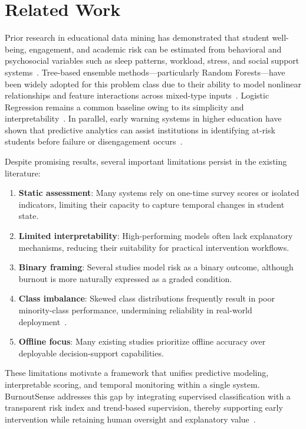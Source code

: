 \documentclass[conference]{IEEEtran}
\begin{document}
\section{Related Work}

Prior research in educational data mining has demonstrated that student well-being, engagement, and academic risk can be estimated from behavioral and psychosocial variables such as sleep patterns, workload, stress, and social support systems~\cite{edm_survey, student_stress_ml}. Tree-based ensemble methods---particularly Random Forests---have been widely adopted for this problem class due to their ability to model nonlinear relationships and feature interactions across mixed-type inputs~\cite{rf_foundation}. Logistic Regression remains a common baseline owing to its simplicity and interpretability~\cite{logreg_multiclass}. In parallel, early warning systems in higher education have shown that predictive analytics can assist institutions in identifying at-risk students before failure or disengagement occurs~\cite{early_warning_higher_ed}.

Despite promising results, several important limitations persist in the existing literature:

\begin{enumerate}[leftmargin=*]
    \item \textbf{Static assessment}: Many systems rely on one-time survey scores or isolated indicators, limiting their capacity to capture temporal changes in student state.
    \item \textbf{Limited interpretability}: High-performing models often lack explanatory mechanisms, reducing their suitability for practical intervention workflows.
    \item \textbf{Binary framing}: Several studies model risk as a binary outcome, although burnout is more naturally expressed as a graded condition.
    \item \textbf{Class imbalance}: Skewed class distributions frequently result in poor minority-class performance, undermining reliability in real-world deployment~\cite{imbalance_learning}.
    \item \textbf{Offline focus}: Many existing studies prioritize offline accuracy over deployable decision-support capabilities.
\end{enumerate}

These limitations motivate a framework that unifies predictive modeling, interpretable scoring, and temporal monitoring within a single system. BurnoutSense addresses this gap by integrating supervised classification with a transparent risk index and trend-based supervision, thereby supporting early intervention while retaining human oversight and explanatory value~\cite{xai_education}.
\end{document}

